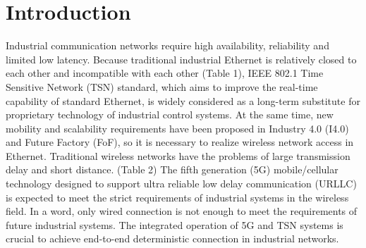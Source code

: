 \documentclass[english]{cccconf}
\begin{document}
\section{Introduction}
Industrial communication networks require high availability, reliability and limited low latency. Because traditional industrial Ethernet is relatively closed to each other and incompatible with each other (Table 1), IEEE 802.1 Time Sensitive Network (TSN) standard, which aims to improve the real-time capability of standard Ethernet, is widely considered as a long-term substitute for proprietary technology of industrial control systems. At the same time, new mobility and scalability requirements have been proposed in Industry 4.0 (I4.0) and Future Factory (FoF), so it is necessary to realize wireless network access in Ethernet. Traditional wireless networks have the problems of large transmission delay and short distance. (Table 2) The fifth generation (5G) mobile/cellular technology designed to support ultra reliable low delay communication (URLLC) is expected to meet the strict requirements of industrial systems in the wireless field. In a word, only wired connection is not enough to meet the requirements of future industrial systems. The integrated operation of 5G and TSN systems is crucial to achieve end-to-end deterministic connection in industrial networks.
\end{document}
